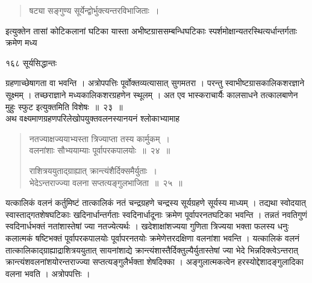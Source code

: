 \documentclass[11pt, openany]{book}
\begin{document}
\begin{quote}
 {\qt षट्या सङ्गुण्य सूर्येन्द्वोर्भुक्त्यन्तरविभाजिताः~।}
\end{quote}

\begin{sloppypar}
 इत्युक्तेन तासां कोटिकलानां घटिका यास्ता अभीष्टग्राससम्बन्धिघटिकाः स्पर्शमोक्षान्यतरस्थित्यर्धान्तर्गताः क्रमेण मध्य
\end{sloppypar}

\newpage



\noindent १६८ \hspace{4cm} सूर्यसिद्धान्तः 
\vspace{1cm}

\begin{sloppypar}
\noindent ग्रहणाच्छेषागता वा भवन्ति । अत्रोपपत्तिः पूर्वोक्तव्यत्यासात् सुगमतरा । परन्तु स्वाभीष्टग्रासकालिकशरज्ञाने सूक्ष्मम् । तच्छराज्ञाने मध्यकालिकशरग्रहणेन स्थूलम् । अत एव भास्कराचार्यैः कालसाधने तत्कालबाणेन मुहुः स्फुट इत्युक्तमिति विशेषः~॥~२३~॥\\
\noindent अथ वक्ष्यमाणग्रहणपरिलेखोपयुक्तवलनस्यानयनं श्लोकाभ्यामाह\textendash
\end{sloppypar}


\begin{quote}
 {\ssi नतज्याक्षज्ययाभ्यस्ता त्रिज्याप्ता तस्य कार्मुकम्~।\\
 वलनांशाः सौभ्ययाम्याः पूर्वापरकपालयोः~॥~२४~॥

 राशित्रययुताद्ग्राह्यात् क्रान्त्यंशैर्दिक्समैर्युताः~।\\
 भेदेऽन्तराज्ज्या वलना सप्तत्यङ्गुलभाजिता~॥~२५~॥}
 \end{quote}

\begin{sloppypar}
 यत्कालिकं वलनं कर्तुमिष्टं तात्कालिकं नतं चन्द्रग्रहणे चन्द्रस्य सूर्यग्रहणे सूर्यस्य माध्यम् । तद्यथा स्वोदयात् स्वास्ताद्गतशेषघटिकाः खदिनार्धान्तर्गताः स्वदिनार्धादूनाः क्रमेण पूर्वापरनतघटिका भवन्ति । तन्नतं नवतिगुणं स्वदिनार्धभक्तं नतांशास्तेषां ज्या नतज्येत्यर्थः । खदेशाक्षांशज्यया गुणिता त्रिज्यया भक्ता फलस्य धनुः कलात्मकं षष्टिभक्तं पूर्वापरकपालयोः पूर्वापरनतयोः क्रमेणेत्तरदक्षिणा वलनांशा भवन्ति । यत्कालिकं वलनं तात्कालिकाद्ग्राह्याद्राशित्रययुतात् सायनांशाद्ये क्रान्त्यंशास्तैर्दिक्तुल्यैर्युतास्तेषां ज्या भेदे भिन्नदिक्त्वेऽन्तरात् क्रान्त्यंशवलनांशयोरन्तराज्ज्या सप्तत्यङ्गुलैर्भक्ता शेषदिक्का । अङ्गुलात्मकत्वेन हरस्योद्देशादङ्गुलादिका वलना भवति । अत्रोपपत्तिः ।
\end{sloppypar}
\end{document}
